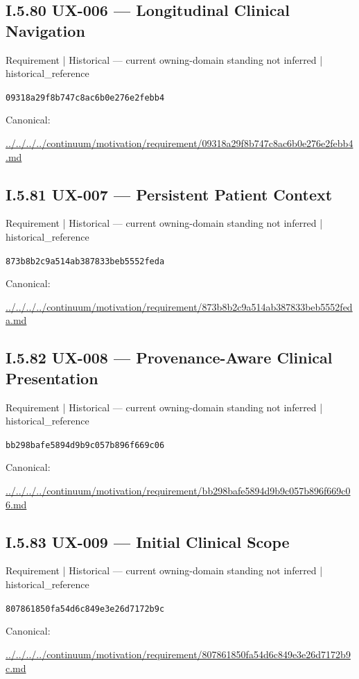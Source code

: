 \documentclass[10pt,a4paper]{article}
\begin{document}
\subsection*{I.5.80 UX-006 — Longitudinal Clinical Navigation}
\label{element-09318a29f8b747c8ac6b0e276e2febb4}
{\small Requirement | Historical — current owning-domain standing not inferred | historical\_reference}\par
\texttt{09318a29f8b747c8ac6b0e276e2febb4}\par
Canonical: \par
{\footnotesize\url{../../../../continuum/motivation/requirement/09318a29f8b747c8ac6b0e276e2febb4.md}}\par
\subsection*{I.5.81 UX-007 — Persistent Patient Context}
\label{element-873b8b2c9a514ab387833beb5552feda}
{\small Requirement | Historical — current owning-domain standing not inferred | historical\_reference}\par
\texttt{873b8b2c9a514ab387833beb5552feda}\par
Canonical: \par
{\footnotesize\url{../../../../continuum/motivation/requirement/873b8b2c9a514ab387833beb5552feda.md}}\par
\subsection*{I.5.82 UX-008 — Provenance-Aware Clinical Presentation}
\label{element-bb298bafe5894d9b9c057b896f669c06}
{\small Requirement | Historical — current owning-domain standing not inferred | historical\_reference}\par
\texttt{bb298bafe5894d9b9c057b896f669c06}\par
Canonical: \par
{\footnotesize\url{../../../../continuum/motivation/requirement/bb298bafe5894d9b9c057b896f669c06.md}}\par
\subsection*{I.5.83 UX-009 — Initial Clinical Scope}
\label{element-807861850fa54d6c849e3e26d7172b9c}
{\small Requirement | Historical — current owning-domain standing not inferred | historical\_reference}\par
\texttt{807861850fa54d6c849e3e26d7172b9c}\par
Canonical: \par
{\footnotesize\url{../../../../continuum/motivation/requirement/807861850fa54d6c849e3e26d7172b9c.md}}\par
\end{document}
